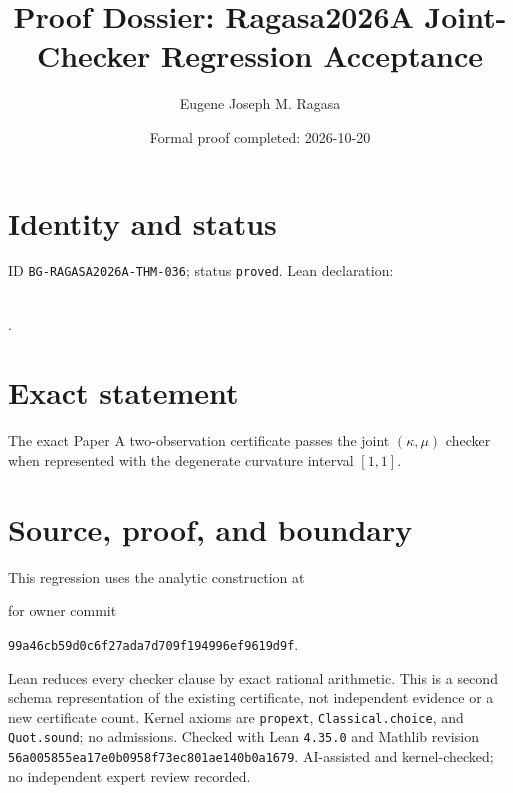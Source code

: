 \documentclass[11pt]{article}
\title{Proof Dossier: Ragasa2026A Joint-Checker Regression Acceptance}\author{Eugene Joseph M. Ragasa}\date{Formal proof completed: 2026-10-20}
\begin{document}
\maketitle
\section{Identity and status}
ID \texttt{BG-RAGASA2026A-THM-036}; status \texttt{proved}. Lean declaration:
\par{}\\
{\tiny{}}.
\section{Exact statement}
The exact Paper A two-observation certificate passes the joint $(\kappa,\mu)$ checker
when represented with the degenerate curvature interval $[1,1]$.
\section{Source, proof, and boundary}
This regression uses the analytic construction at
\begin{center}\small{}\end{center}
for owner commit
\begin{center}\small\texttt{99a46cb59d0c6f27ada7d709f194996ef9619d9f}.\end{center}
Lean reduces every checker clause by exact rational arithmetic. This is a second schema
representation of the existing certificate, not independent evidence or a new certificate
count. Kernel axioms are \texttt{propext}, \texttt{Classical.choice}, and
\texttt{Quot.sound}; no admissions. Checked with Lean \texttt{4.35.0} and Mathlib
revision \texttt{56a005855ea17e0b0958f73ec801ae140b0a1679}. AI-assisted and
kernel-checked; no independent expert review recorded.
\end{document}
